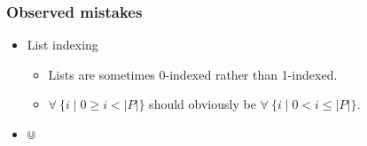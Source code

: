 \begin{frame}

\frametitle{Observed mistakes}

\begin{itemize}

\item List indexing

\begin{itemize}

\item \bi Lists are sometimes 0-indexed rather than 1-indexed.

\item \bi $\forall\ \{i\mid 0\geq i < |P|\}$ should obviously be $\forall\
\{i\mid 0< i \leq |P|\}$.

\end{itemize}

\item $\Cup$

\end{itemize}

\end{frame}
